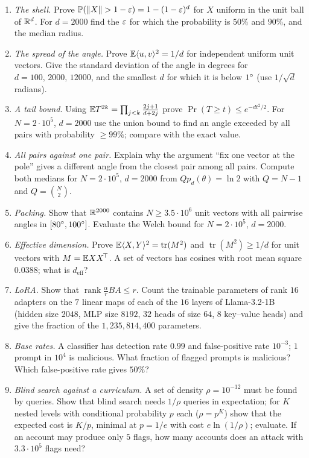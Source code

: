 \begin{exercise}[Problems]
\begin{enumerate}
  \item \emph{The shell.} Prove $\mathbb{P}(\left\lVert X\right\rVert>1-\varepsilon)=1-(1-\varepsilon)^d$ for $X$ uniform in the unit ball of $\mathbb{R}^d$. For $d=2000$ find the $\varepsilon$ for which the probability is $50\%$ and $90\%$, and the median radius.
  \item \emph{The spread of the angle.} Prove $\mathbb{E}\langle u,v\rangle^2=1/d$ for independent uniform unit vectors. Give the standard deviation of the angle in degrees for $d=100,\,2000,\,12000$, and the smallest $d$ for which it is below $1^{\circ}$ (use $1/\sqrt d$ radians).
  \item \emph{A tail bound.} Using $\mathbb{E} T^{2k}=\prod_{j<k}\frac{2j+1}{d+2j}$ prove $\Pr(T\ge t)\le e^{-dt^2/2}$. For $N=2\cdot10^5$, $d=2000$ use the union bound to find an angle exceeded by all pairs with probability $\ge99\%$; compare with the exact value.
  \item \emph{All pairs against one pair.} Explain why the argument ``fix one vector at the pole'' gives a different angle from the closest pair among all pairs. Compute both medians for $N=2\cdot10^5$, $d=2000$ from $Qp_d(\theta)=\ln2$ with $Q=N-1$ and $Q=\binom N2$.
  \item \emph{Packing.} Show that $\mathbb{R}^{2000}$ contains $N\ge3.5\cdot10^6$ unit vectors with all pairwise angles in $[80^{\circ},100^{\circ}]$. Evaluate the Welch bound for $N=2\cdot10^5$, $d=2000$.
  \item \emph{Effective dimension.} Prove $\mathbb{E}\langle X,Y\rangle^2=\operatorname{tr}(M^2)$ and $\operatorname{tr}(M^2)\ge1/d$ for unit vectors with $M=\mathbb{E} XX^{\!\top}$. A set of vectors has cosines with root mean square $0.0388$; what is $d_{\mathrm{eff}}$?
  \item \emph{LoRA.} Show that $\operatorname{rank}\frac{\alpha}{r}BA\le r$. Count the trainable parameters of rank $16$ adapters on the $7$ linear maps of each of the $16$ layers of Llama-3.2-1B (hidden size $2048$, MLP size $8192$, $32$ heads of size $64$, $8$ key--value heads) and give the fraction of the $1{,}235{,}814{,}400$ parameters.
  \item \emph{Base rates.} A classifier has detection rate $0.99$ and false-positive rate $10^{-3}$; $1$ prompt in $10^4$ is malicious. What fraction of flagged prompts is malicious? Which false-positive rate gives $50\%$?
  \item \emph{Blind search against a curriculum.} A set of density $\rho=10^{-12}$ must be found by queries. Show that blind search needs $1/\rho$ queries in expectation; for $K$ nested levels with conditional probability $p$ each ($\rho=p^K$) show that the expected cost is $K/p$, minimal at $p=1/e$ with cost $e\ln(1/\rho)$; evaluate. If an account may produce only $5$ flags, how many accounts does an attack with $3.3\cdot10^5$ flags need?
\end{enumerate}
\end{exercise}

